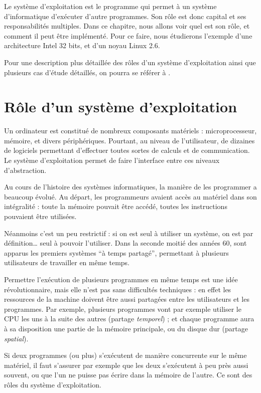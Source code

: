 Le système d'exploitation est le programme qui permet à un système
d'informatique d'exécuter d'autre programmes. Son rôle est donc capital et ses
responsabilités multiples. Dans ce chapitre, nous allons voir quel est son rôle,
et comment il peut être implémenté. Pour ce faire, nous étudierons l'exemple
d'une architecture Intel 32 bits, et d'un noyau Linux 2.6.

Pour une description plus détaillée des rôles d'un système d'exploitation ainsi
que plusieurs cas d'étude détaillés, on pourra se référer à \cite{tanenbaum}.

\section{Rôle d'un système d'exploitation}

Un ordinateur est constitué de nombreux composants matériels : microprocesseur,
mémoire, et divers périphériques. Pourtant, au niveau de l'utilisateur, de
dizaines de logiciels permettant d'effectuer toutes sortes de calculs et de
communication. Le système d'exploitation permet de faire l'interface entre ces
niveaux d'abstraction.

Au cours de l'histoire des systèmes informatiques, la manière de les programmer
a beaucoup évolué. Au départ, les programmeurs avaient accès au matériel dans
son intégralité : toute la mémoire pouvait être accédé, toutes les instructions
pouvaient être utilisées.

Néanmoins c'est un peu restrictif : si on est seul à utiliser un système, on est
par définition… seul à pouvoir l'utiliser. Dans la seconde moitié des années 60,
sont apparus les premiers systèmes ``à temps partagé'', permettant à plusieurs
utilisateurs de travailler en même temps.

Permettre l'exécution de plusieurs programmes en même temps est une idée
révolutionnaire, mais elle n'est pas sans difficultés techniques : en effet les
ressources de la machine doivent être aussi partagées entre les utilisateurs et
les programmes. Par exemple, plusieurs programmes vont par exemple utiliser le
CPU les uns à la suite des autres (partage \emph{temporel}) ; et chaque
programme aura à sa disposition une partie de la mémoire principale, ou du
disque dur (partage \emph{spatial}).

Si deux programmes (ou plus) s'exécutent de manière concurrente sur le même
matériel, il faut s'assurer par exemple que les deux s'exécutent à peu près
aussi souvent, ou que l'un ne puisse pas écrire dans la mémoire de l'autre. Ce
sont des rôles du système d'exploitation.

